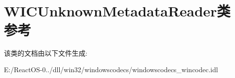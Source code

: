 \hypertarget{class_w_i_c_unknown_metadata_reader}{}\section{W\+I\+C\+Unknown\+Metadata\+Reader类 参考}
\label{class_w_i_c_unknown_metadata_reader}


该类的文档由以下文件生成\+:\begin{DoxyCompactItemize}
\item 
E\+:/\+React\+O\+S-\/0../dll/win32/windowscodecs/windowscodecs\+\_\+wincodec.\+idl\end{DoxyCompactItemize}
